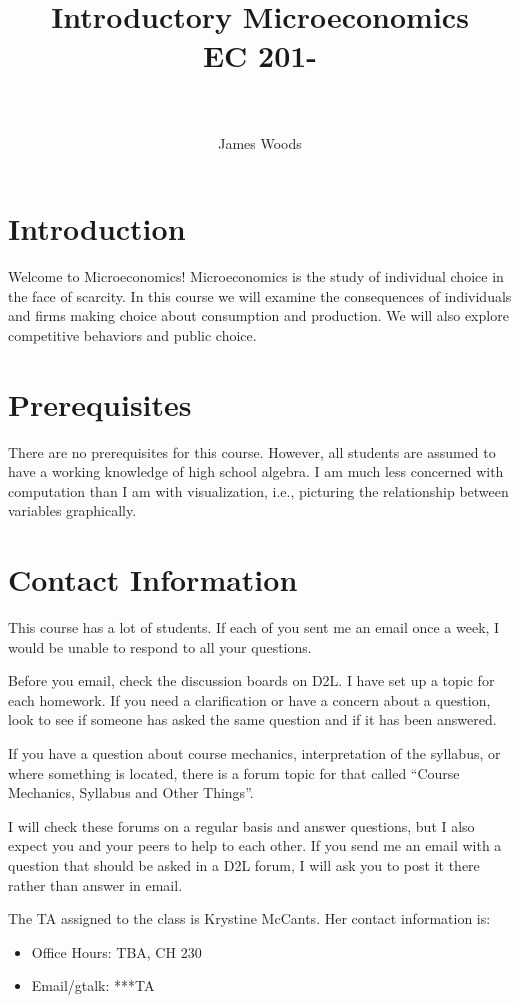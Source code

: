 \documentclass[letterpaper,10pt]{article}
\title{
Introductory Microeconomics\\
EC 201-\Section \\
\Term\\
}
\author{James Woods}
\date{}
\begin{document}
\maketitle

\section{Introduction}

Welcome to Microeconomics! Microeconomics is the study of individual
choice in the face of scarcity. In this course we will examine the
consequences of individuals and firms making choice about consumption
and production. We will also explore competitive behaviors and public
choice.

\section{Prerequisites}

There are no prerequisites for this course. However, all students are
assumed to have a working knowledge of high school algebra. I am much
less concerned with computation than I am with visualization, i.e.,
picturing the relationship between variables graphically.


\section{Contact Information}
This course has a lot of students.  If each of you sent me an email
once a week, I would be unable to respond to all your questions.

Before you email, check the discussion boards on D2L.  I have set up a
topic for each homework. If you need a clarification or
have a concern about a question, look to see if someone has asked
the same question and if it has been answered.

If you have a question about course mechanics, interpretation of the
syllabus, or where something is located, there is a forum topic for
that called ``Course Mechanics, Syllabus and Other Things''.

I will check these forums on a regular basis and answer questions, but
I also expect you and your peers to help to each other.  If you send
me an email with a question that should be asked in a D2L forum, I
will ask you to post it there rather than answer in email.

The TA assigned to the class is Krystine McCants. 
 Her contact information is:
 \begin{itemize}
 \item Office Hours: TBA, CH 230
 \item Email/gtalk: ***TA
 \end{itemize}
\end{document}
